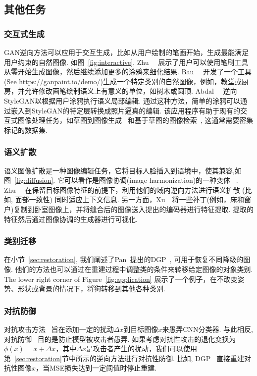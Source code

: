 \subsection{其他任务}
\subsubsection{交互式生成}
\label{sec:interactive}

GAN逆向方法可以应用于交互生成，比如从用户绘制的笔画开始，生成最能满足用户约束的自然图像. 
如图~\ref{fig:interactive}, Zhu~\etal~\cite{zhu2016generative} 展示了用户可以使用笔刷工具从零开始生成图像，然后继续添加更多的涂鸦来细化结果.
Bau~\etal~\cite{bau2019ganpaint} 开发了一个工具 (See https://ganpaint.io/demo/)生成一个特定类别的自然图像，例如，教堂或厨房，并允许修改画笔绘制语义上有意义的单位，如树木或圆顶.
Abdal~\etal~\cite{abdal2020image2stylegan2} 逆向StyleGAN以根据用户涂鸦执行语义局部编辑. 
通过这种方法，简单的涂鸦可以通过嵌入到StyleGAN的特定层转换成照片逼真的编辑.
该应用程序有助于现有的交互式图像处理任务，如草图到图像生成~\cite{xia2019sketch,ghosh2019isketchnfill,chenDeepFaceDrawing2020} 和基于草图的图像检索~\cite{eitz2010sketch,dey2019doodle}, 这通常需要密集标记的数据集.

\figinteractive

\subsubsection{语义扩散}
\label{sec:diffusion}
语义图像扩散是一种图像编辑任务，它将目标人脸插入到语境中，使其兼容,如图~\ref{fig:diffusion}. 
它可以看作是图像协调(image harmonization)的一种变体 ~\cite{cohen2006color,huang2018multimodal,tsai2017deep}.
Zhu~\etal~\cite{zhu2020indomain} 在保留目标图像特征的前提下，利用他们的域内逆向方法进行语义扩散 (比如, 面部一致性) 同时适应上下文信息.
另一方面，Xu~\etal~\cite{xu2020ghfeat}将一些补丁(例如，床和窗户)复制到卧室图像上，并将缝合后的图像送入提出的编码器进行特征提取. 
提取的特征然后通过图像协调的生成器进行可视化.

\subsubsection{类别迁移}
\label{sec:category}
在小节~\ref{sec:restoration}, 我们阐述了Pan~\etal 提出的DGP~\cite{pan2020exploiting}, 可用于恢复不同降级的图像.
他们的方法也可以通过在重建过程中调整类的条件来转移给定图像的对象类别. 
The lower right corner of  Figure~\ref{fig:application} 展示了一个例子，在不改变姿势、形状或背景的情况下，将狗转移到其他各种类别.

\subsubsection{对抗防御}
\label{sec:defense}
对抗攻击方法~\cite{fan2020sparse,chen2020boosting,wu2020sapf,baluja2017adversarial} 旨在添加一定的扰动$\Delta x$到目标图像$x$来愚弄CNN分类器. 
与此相反, 对抗防御~\cite{samangouei2018defense,dhillon2018stochastic} 目的是防止模型被攻击者愚弄.
如果考虑对抗性攻击的退化变换为$\phi(x)=x+\Delta x$，其中$\Delta x$是攻击者产生的扰动，我们可以使用第~\ref{sec:restoration}节中所示的逆向方法进行对抗性防御.
比如, DGP~\cite{pan2020exploiting} 直接重建对抗性图像$\hat{x}$，当MSE损失达到一定阈值时停止重建.

\figdiffusion